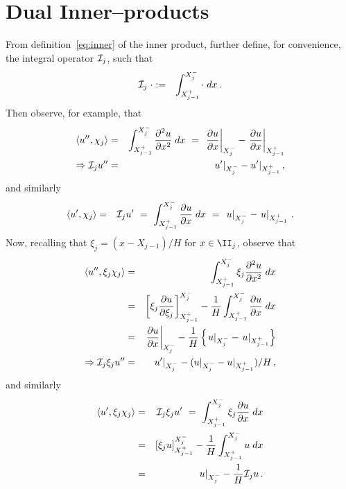 \documentclass[12pt,a5paper]{article}
\begin{document}
\section{Dual Inner--products}\label{sec:inner}
From definition~\eqref{eq:inner} of the inner product, further define, for convenience,
the integral operator ${\cal I}_j$, such that
\begin{eqnarray}
{\cal I}_j\;\cdot & := & \int_{X^+_{j-1}}^{X^-_j}\cdot\;dx\,.
\label{eq:iop}
\end{eqnarray}
Then observe, for example, that
\begin{eqnarray}
\langle u'',\chi_j\rangle & = & \int_{X^+_{j-1}}^{X^-_j}\DD xu\;dx
~=~\left.\D xu\right|_{X^-_j} - \left.\D xu\right|_{X^+_{j-1}}
\\
\Rightarrow {\cal I}_j u'' & = & u'|_{X^-_j}-u'|_{X^+_{j-1}}\,,
\label{eq:udd:chi}
\end{eqnarray}
and similarly
\begin{eqnarray}
\langle u',\chi_j\rangle & = & {\cal I}_j u'
~=~\int_{X^+_{j-1}}^{X^-_j}\D xu\;dx
~=~\left.u\right|_{X^-_j} - \left.u\right|_{X^+_{j-1}}
\,.
\label{eq:ud:chi}
\end{eqnarray}
Now, recalling that $\xi_j=(x-X_{j-1})/H$ for $x\in\II_j$, observe that
\begin{eqnarray}
\langle u'',\xi_j\chi_j\rangle & = & \int_{X^+_{j-1}}^{X^-_j}\xi_j\DD xu\;dx
\nonumber\\
& = & \left[\xi_j\D {\xi_j}u\right]_{X^+_{j-1}}^{X^-_j}
-\frac{1}{H}\int_{X^+_{j-1}}^{X^-_j}\D xu\;dx
\nonumber\\
& = & \left.\D xu\right|_{X^-_j}-\frac{1}{H}\left\{
\left.u\right|_{X^-_j} - \left.u\right|_{X^+_{j-1}}
\right\}
\\
\Rightarrow {\cal I}_j\xi_ju'' & = & u'|_{X^-_j}-(u|_{X^-_j}-u|_{X^+_{j-1}})/H\,,
\label{eq:udd:xi:chi}
\end{eqnarray}
and similarly
\begin{eqnarray}
\langle u',\xi_j\chi_j\rangle & = & {\cal I}_j\xi_ju'
~=~\int_{X^+_{j-1}}^{X^-_j}\xi_j\D xu\;dx
\nonumber\\
& = & \left[\xi_j u\right]_{X^+_{j-1}}^{X^-_j}
-\frac{1}{H}\int_{X^+_{j-1}}^{X^-_j}u\;dx
\nonumber\\
& = & \left.u\right|_{X^-_j}-\frac{1}{H}{\cal I}_j u\,.
\label{eq:ud:xi:chi}
\end{eqnarray}
\end{document}
